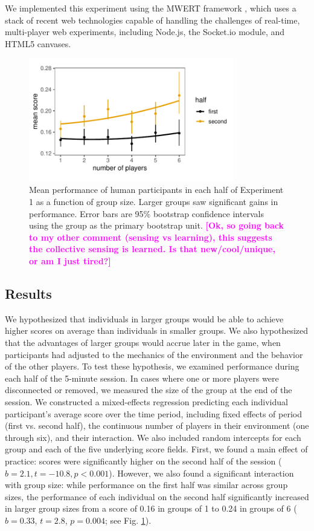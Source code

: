 \documentclass[12pt,letterpaper]{article}
\newcommand{\andrew}[1]{\textcolor{magenta}{\bf [#1]}}
\begin{document}
We implemented this experiment using the MWERT framework \cite{hawkins_conducting_2014}, which uses a stack of recent web technologies capable of handling the challenges of real-time, multi-player web experiments, including Node.js, the Socket.io module, and HTML5 canvases.  

\begin{figure}[t!]
  \centering
  \includegraphics[width=0.8\textwidth]{./figures/performance-summary-exp1.pdf}
  \caption{Mean performance of human participants in each half of Experiment 1 as a function of group size. Larger groups saw significant gains in performance. Error bars are 95\% bootstrap confidence intervals using the group as the primary bootstrap unit. \andrew{Ok, so going back to my other comment (sensing vs learning), this suggests the collective sensing is learned. Is that new/cool/unique, or am I just tired?} }
  \label{fig:exp1_performance}
\end{figure}

\subsection{Results}

We hypothesized that individuals in larger groups would be able to achieve higher scores on average than individuals in smaller groups. 
We also hypothesized that the advantages of larger groups would accrue later in the game, when participants had adjusted to the mechanics of the environment and the behavior of the other players.
To test these hypothesis, we examined performance during each half of the 5-minute session. 
In cases where one or more players were disconnected or removed, we measured the size of the group at the end of the session.
We constructed a mixed-effects regression predicting each individual participant's average score over the time period, including fixed effects of period (first vs. second half), the continuous number of players in their environment (one through six), and their interaction.
We also included random intercepts for each group and each of the five underlying score fields.
First, we found a main effect of practice: scores were significantly higher on the second half of the session ($b = 2.1,t=-10.8, p < 0.001$).
However, we also found a significant interaction with group size: while performance on the first half was similar across group sizes, the performance of each individual on the second half significantly increased in larger group sizes from a score of 0.16 in groups of 1 to 0.24 in groups of 6 ($b = 0.33$, $t = 2.8$, $p = 0.004$; see Fig. \ref{fig:exp1_performance}). 
\end{document}
